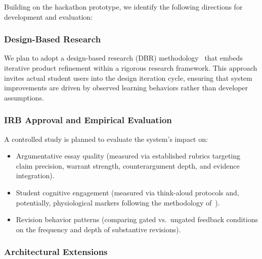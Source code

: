 \documentclass[11pt,a4paper]{article}
\begin{document}
Building on the hackathon prototype, we identify the following directions for development and evaluation:

\subsubsection{Design-Based Research}

We plan to adopt a design-based research (DBR) methodology~\cite{noroozi2016relations} that embeds iterative product refinement within a rigorous research framework. This approach invites actual student users into the design iteration cycle, ensuring that system improvements are driven by observed learning behaviors rather than developer assumptions.

\subsubsection{IRB Approval and Empirical Evaluation}

A controlled study is planned to evaluate the system's impact on:
\begin{itemize}[leftmargin=*]
    \item Argumentative essay quality (measured via established rubrics targeting claim precision, warrant strength, counterargument depth, and evidence integration).
    \item Student cognitive engagement (measured via think-aloud protocols and, potentially, physiological markers following the methodology of~\cite{kosmyna2025brain}).
    \item Revision behavior patterns (comparing gated vs.\ ungated feedback conditions on the frequency and depth of substantive revisions).
\end{itemize}

\subsubsection{Architectural Extensions}
\end{document}
